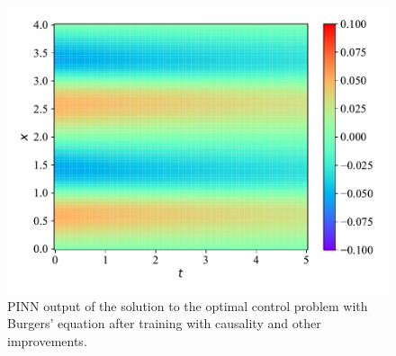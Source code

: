 \begin{figure}[H]
    \centering
    \includegraphics[width=1.0\linewidth]{Figures/AdvancedExperiments/InitialControlCausal/attempt1/burger.pdf}
    \caption{PINN output of the solution to the optimal control problem with Burgers' equation after training with causality and other improvements.}
    \label{fig:burger_control_initial_attempt1}
\end{figure}

